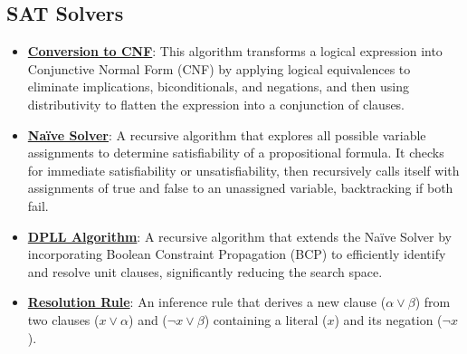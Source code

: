\documentclass{article}%
\begin{document}
\subsection{SAT Solvers}%
\label{subsec:SATSolvers}%
\begin{itemize}[leftmargin=*]%
\item \href{https://purdue.brightspace.com/d2l/common/assets/pdfjs-d2l-dist/1.0.14-legacy/web/viewer.html?file=%2Fcontent%2Fenforced%2F1095467-wl.202510.CS.24300.001%2F13L1-Logic.pdf%3Fou%3D1095467&lang=en-us&container=d2l-fileviewer-rendered-pdf&fullscreen=d2l-fileviewer-rendered-pdf-dialog&height=667#page=17}{\textbf{Conversion to CNF}}: This algorithm transforms a logical expression into Conjunctive Normal Form (CNF) by applying logical equivalences to eliminate implications, biconditionals, and negations, and then using distributivity to flatten the expression into a conjunction of clauses.%
\item \href{https://purdue.brightspace.com/d2l/common/assets/pdfjs-d2l-dist/1.0.14-legacy/web/viewer.html?file=%2Fcontent%2Fenforced%2F1095467-wl.202510.CS.24300.001%2F15L2-SAT.pdf%3Fou%3D1095467&lang=en-us&container=d2l-fileviewer-rendered-pdf&fullscreen=d2l-fileviewer-rendered-pdf-dialog&height=667#page=18}{\textbf{Naïve Solver}}: A recursive algorithm that explores all possible variable assignments to determine satisfiability of a propositional formula. It checks for immediate satisfiability or unsatisfiability, then recursively calls itself with assignments of true and false to an unassigned variable, backtracking if both fail.%
\item \href{https://purdue.brightspace.com/d2l/common/assets/pdfjs-d2l-dist/1.0.14-legacy/web/viewer.html?file=%2Fcontent%2Fenforced%2F1095467-wl.202510.CS.24300.001%2F15L2-SAT.pdf%3Fou%3D1095467&lang=en-us&container=d2l-fileviewer-rendered-pdf&fullscreen=d2l-fileviewer-rendered-pdf-dialog&height=667#page=17}{\textbf{DPLL Algorithm}}: A recursive algorithm that extends the Naïve Solver by incorporating Boolean Constraint Propagation (BCP) to efficiently identify and resolve unit clauses, significantly reducing the search space.%
\item \href{https://purdue.brightspace.com/d2l/common/assets/pdfjs-d2l-dist/1.0.14-legacy/web/viewer.html?file=%2Fcontent%2Fenforced%2F1095467-wl.202510.CS.24300.001%2F15L2-SAT.pdf%3Fou%3D1095467&lang=en-us&container=d2l-fileviewer-rendered-pdf&fullscreen=d2l-fileviewer-rendered-pdf-dialog&height=667#page=32}{\textbf{Resolution Rule}}: An inference rule that derives a new clause ($α ∨ β$) from two clauses ($x ∨ α$) and ($¬x ∨ β$) containing a literal ($x$) and its negation ($¬x$).%

\end{itemize}
\end{document}
